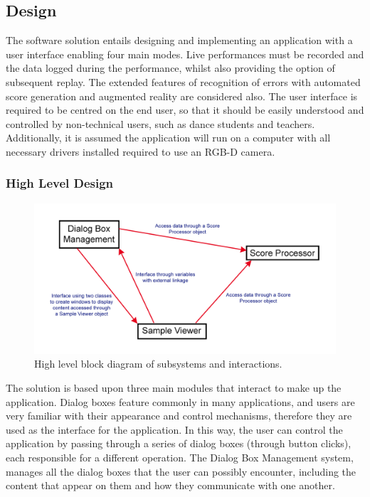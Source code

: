 \documentclass[11pt,a4paper]{article}
\begin{document}
\subsection{Design}
The software solution entails designing and implementing an application with a user interface enabling four main modes. Live performances must be recorded and the data logged during the performance, whilst also providing the option of subsequent replay. The extended features of recognition of errors with automated score generation and augmented reality are considered also. The user interface is required to be centred on the end user, so that it should be easily understood and controlled by non-technical users, such as dance students and teachers. Additionally, it is assumed the application will run on a computer with all necessary drivers installed required to use an RGB-D camera.
\subsubsection{High Level Design}

\begin{figure}[H]
\centering
\includegraphics[scale=0.15]{System_Architecture_Diagram.jpg}
\caption{High level block diagram of subsystems and interactions.}
\label{system_architecture}
\end{figure}

The solution is based upon three main modules that interact to make up the application. Dialog boxes feature commonly in many applications, and users are very familiar with their appearance and control mechanisms, therefore they are used as the interface for the application. In this way, the user can control the application by passing through a series of dialog boxes (through button clicks), each responsible for a different operation. The Dialog Box Management system, manages all the dialog boxes that the user can possibly encounter, including the content that appear on them and how they communicate with one another.
\end{document}
